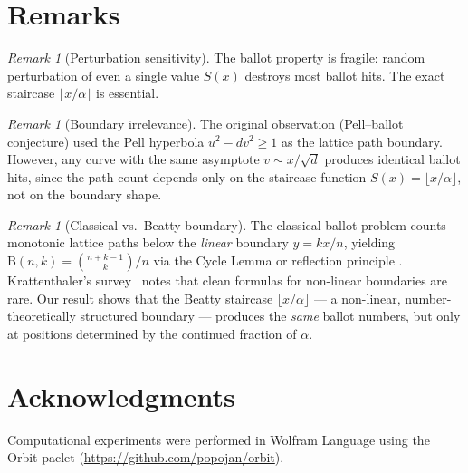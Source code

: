 \documentclass[11pt]{article}
\theoremstyle{definition}
\theoremstyle{remark}
\newtheorem{remark}[theorem]{Remark}
\newcommand{\floor}[1]{\lfloor #1 \rfloor}
\newcommand{\B}{\mathrm{B}}
\begin{document}
\section{Remarks}

\begin{remark}[Perturbation sensitivity]
The ballot property is fragile: random perturbation of even a single value $S(x)$ destroys most ballot hits.
The exact staircase $\floor{x/\alpha}$ is essential.
\end{remark}

\begin{remark}[Boundary irrelevance]
The original observation (Pell--ballot conjecture) used the Pell hyperbola $u^2 - dv^2 \geq 1$ as the lattice path boundary.
However, any curve with the same asymptote $v \sim x/\sqrt{d}$ produces identical ballot hits, since the path count depends only on the staircase function $S(x) = \floor{x/\alpha}$, not on the boundary shape.
\end{remark}

\begin{remark}[Classical vs.\ Beatty boundary]
The classical ballot problem counts monotonic lattice paths below the \emph{linear} boundary $y = kx/n$, yielding $\B(n,k) = \binom{n+k-1}{k}/n$ via the Cycle Lemma or reflection principle \cite{DvoretzkyMotzkin1947, Andre1887}.
Krattenthaler's survey~\cite{Krattenthaler2015} notes that clean formulas for non-linear boundaries are rare.
Our result shows that the Beatty staircase $\floor{x/\alpha}$ --- a non-linear, number-theoretically structured boundary --- produces the \emph{same} ballot numbers, but only at positions determined by the continued fraction of $\alpha$.
\end{remark}

\section*{Acknowledgments}

Computational experiments were performed in Wolfram Language using the Orbit paclet (\url{https://github.com/popojan/orbit}).



\end{document}
